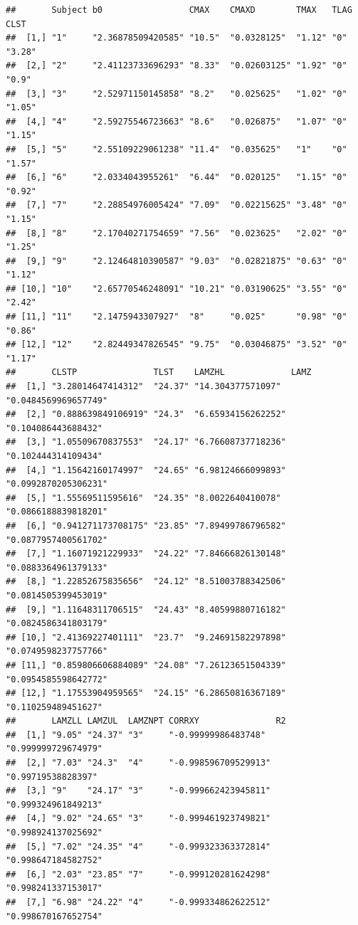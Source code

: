 \documentclass[]{krantz}
\theoremstyle{definition}
\theoremstyle{definition}
\theoremstyle{definition}
\theoremstyle{remark}
\begin{document}
\begin{verbatim}
##       Subject b0                 CMAX    CMAXD        TMAX   TLAG CLST  
##  [1,] "1"     "2.36878509420585" "10.5"  "0.0328125"  "1.12" "0"  "3.28"
##  [2,] "2"     "2.41123733696293" "8.33"  "0.02603125" "1.92" "0"  "0.9" 
##  [3,] "3"     "2.52971150145858" "8.2"   "0.025625"   "1.02" "0"  "1.05"
##  [4,] "4"     "2.59275546723663" "8.6"   "0.026875"   "1.07" "0"  "1.15"
##  [5,] "5"     "2.55109229061238" "11.4"  "0.035625"   "1"    "0"  "1.57"
##  [6,] "6"     "2.0334043955261"  "6.44"  "0.020125"   "1.15" "0"  "0.92"
##  [7,] "7"     "2.28854976005424" "7.09"  "0.02215625" "3.48" "0"  "1.15"
##  [8,] "8"     "2.17040271754659" "7.56"  "0.023625"   "2.02" "0"  "1.25"
##  [9,] "9"     "2.12464810390587" "9.03"  "0.02821875" "0.63" "0"  "1.12"
## [10,] "10"    "2.65770546248091" "10.21" "0.03190625" "3.55" "0"  "2.42"
## [11,] "11"    "2.1475943307927"  "8"     "0.025"      "0.98" "0"  "0.86"
## [12,] "12"    "2.82449347826545" "9.75"  "0.03046875" "3.52" "0"  "1.17"
##       CLSTP               TLST    LAMZHL             LAMZ                
##  [1,] "3.28014647414312"  "24.37" "14.304377571097"  "0.0484569969657749"
##  [2,] "0.888639849106919" "24.3"  "6.65934156262252" "0.104086443688432" 
##  [3,] "1.05509670837553"  "24.17" "6.76608737718236" "0.102444314109434" 
##  [4,] "1.15642160174997"  "24.65" "6.98124666099893" "0.0992870205306231"
##  [5,] "1.55569511595616"  "24.35" "8.0022640410078"  "0.0866188839818201"
##  [6,] "0.941271173708175" "23.85" "7.89499786796582" "0.0877957400561702"
##  [7,] "1.16071921229933"  "24.22" "7.84666826130148" "0.0883364961379133"
##  [8,] "1.22852675835656"  "24.12" "8.51003788342506" "0.0814505399453019"
##  [9,] "1.11648311706515"  "24.43" "8.40599880716182" "0.0824586341803179"
## [10,] "2.41369227401111"  "23.7"  "9.24691582297898" "0.0749598237757766"
## [11,] "0.859806606884089" "24.08" "7.26123651504339" "0.0954585598642772"
## [12,] "1.17553904959565"  "24.15" "6.28650816367189" "0.110259489451627" 
##       LAMZLL LAMZUL  LAMZNPT CORRXY               R2                 
##  [1,] "9.05" "24.37" "3"     "-0.99999986483748"  "0.999999729674979"
##  [2,] "7.03" "24.3"  "4"     "-0.998596709529913" "0.99719538828397" 
##  [3,] "9"    "24.17" "3"     "-0.999662423945811" "0.999324961849213"
##  [4,] "9.02" "24.65" "3"     "-0.999461923749821" "0.998924137025692"
##  [5,] "7.02" "24.35" "4"     "-0.999323363372814" "0.998647184582752"
##  [6,] "2.03" "23.85" "7"     "-0.999120281624298" "0.998241337153017"
##  [7,] "6.98" "24.22" "4"     "-0.999334862622512" "0.998670167652754"

\end{verbatim}
\end{document}
